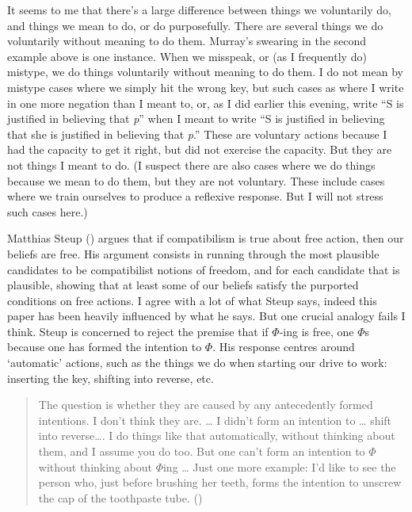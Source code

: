 \documentclass[
  11pt,
  letterpaper,
  DIV=11,
  numbers=noendperiod,
  oneside]{scrartcl}
\begin{document}
It seems to me that there's a large difference between things we
voluntarily do, and things we mean to do, or do purposefully. There are
several things we do voluntarily without meaning to do them. Murray's
swearing in the second example above is one instance. When we misspeak,
or (as I frequently do) mistype, we do things voluntarily without
meaning to do them. I do not mean by mistype cases where we simply hit
the wrong key, but such cases as where I write in one more negation than
I meant to, or, as I did earlier this evening, write ``S is justified in
believing that \emph{p}'' when I meant to write ``S is justified in
believing that she is justified in believing that \emph{p}.'' These are
voluntary actions because I had the capacity to get it right, but did
not exercise the capacity. But they are not things I meant to do. (I
suspect there are also cases where we do things because we mean to do
them, but they are not voluntary. These include cases where we train
ourselves to produce a reflexive response. But I will not stress such
cases here.)

Matthias Steup () argues that if
compatibilism is true about free action, then our beliefs are free. His
argument consists in running through the most plausible candidates to be
compatibilist notions of freedom, and for each candidate that is
plausible, showing that at least some of our beliefs satisfy the
purported conditions on free actions. I agree with a lot of what Steup
says, indeed this paper has been heavily influenced by what he says. But
one crucial analogy fails I think. Steup is concerned to reject the
premise that if \(\Phi\)-ing is free, one \(\Phi\)s because one has
formed the intention to \(\Phi\). His response centres around
`automatic' actions, such as the things we do when starting our drive to
work: inserting the key, shifting into reverse, etc.

\begin{quote}
The question is whether they are caused by any antecedently formed
intentions. I don't think they are. \ldots{} I didn't form an intention
to \ldots{} shift into reverse\ldots. I do things like that
automatically, without thinking about them, and I assume you do too. But
one can't form an intention to \(\Phi\) without thinking about
\(\Phi\)ing \ldots{} Just one more example: I'd like to see the person
who, just before brushing her teeth, forms the intention to unscrew the
cap of the toothpaste tube. ()
\end{quote}
\end{document}

